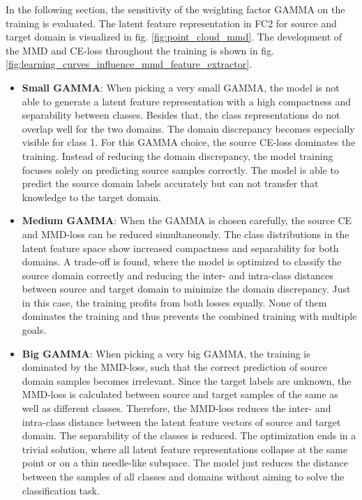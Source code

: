 In the following section, the sensitivity of the weighting factor GAMMA on the training is evaluated. The latent feature representation in FC2 for source and target domain is visualized in fig. \ref{fig:point_cloud_mmd}. The development of the MMD and CE-loss throughout the training is shown in fig. \ref{fig:learning_curves_influence_mmd_feature_extractor}.
\begin{itemize}
    \item \textbf{Small GAMMA}:
    When picking a very small GAMMA, the model is not able to generate a latent feature representation with a high compactness and separability between classes. Besides that, the class representations do not overlap well for the two domains. The domain discrepancy becomes especially visible for class 1. For this GAMMA choice, the source CE-loss dominates the training. Instead of reducing the domain discrepancy, the model training focuses solely on predicting source samples correctly. The model is able to predict the source domain labels accurately but can not transfer that knowledge to the target domain. 
    \item \textbf{Medium GAMMA}:
    When the GAMMA is chosen carefully, the source CE and MMD-loss can be reduced simultaneously. The class distributions in the latent feature space show increased compactness and separability for both domains. A trade-off is found, where the model is optimized to classify the source domain correctly and reducing the inter- and intra-class distances between source and target domain to minimize the domain discrepancy. Just in this case, the training profits from both losses equally. None of them dominates the training and thus prevents the combined training with multiple goals.
    \item \textbf{Big GAMMA}:
    When picking a very big GAMMA, the training is dominated by the MMD-loss, such that the correct prediction of source domain samples becomes irrelevant. Since the target labels are unknown, the MMD-loss is calculated between source and target samples of the same as well as different classes. Therefore, the MMD-loss reduces the inter- and intra-class distance between the latent feature vectors of source and target domain. The separability of the classes is reduced. The optimization ends in a trivial solution, where all latent feature representations collapse at the same point or on a thin needle-like subspace. The model just reduces the distance between the samples of all classes and domains without aiming to solve the classification task.
\end{itemize}


